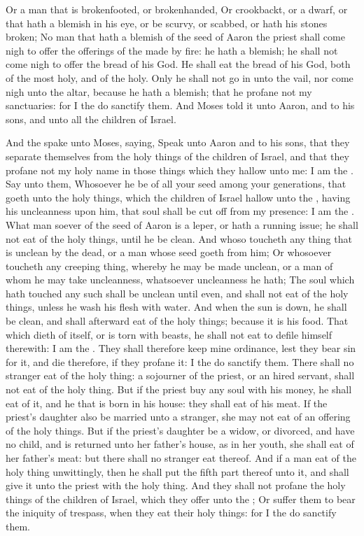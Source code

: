\begin{biblechapter}
\verse Or a man that is brokenfooted, or brokenhanded,
\verse Or crookbackt, or a dwarf, or that hath a blemish in his eye, or be scurvy, or scabbed, or hath his stones broken;
\verse No man that hath a blemish of the seed of Aaron the priest shall come nigh to offer the offerings of the \LORD made by fire: he hath a blemish; he shall not come nigh to offer the bread of his God.
\verse He shall eat the bread of his God, both of the most holy, and of the holy.
\verse Only he shall not go in unto the vail, nor come nigh unto the altar, because he hath a blemish; that he profane not my sanctuaries: for I the \LORD do sanctify them.
\verse And Moses told it unto Aaron, and to his sons, and unto all the children of Israel.
\end{biblechapter}

\begin{biblechapter} %
\verse And the \LORD spake unto Moses, saying,
\verse Speak unto Aaron and to his sons, that they separate themselves from the holy things of the children of Israel, and that they profane not my holy name in those things which they hallow unto me: I am the \LORD.
\verse Say unto them, Whosoever he be of all your seed among your generations, that goeth unto the holy things, which the children of Israel hallow unto the \LORD, having his uncleanness upon him, that soul shall be cut off from my presence: I am the \LORD.
\verse What man soever of the seed of Aaron is a leper, or hath a running issue; he shall not eat of the holy things, until he be clean. And whoso toucheth any thing that is unclean by the dead, or a man whose seed goeth from him;
\verse Or whosoever toucheth any creeping thing, whereby he may be made unclean, or a man of whom he may take uncleanness, whatsoever uncleanness he hath;
\verse The soul which hath touched any such shall be unclean until even, and shall not eat of the holy things, unless he wash his flesh with water.
\verse And when the sun is down, he shall be clean, and shall afterward eat of the holy things; because it is his food.
\verse That which dieth of itself, or is torn with beasts, he shall not eat to defile himself therewith: I am the \LORD.
\verse They shall therefore keep mine ordinance, lest they bear sin for it, and die therefore, if they profane it: I the \LORD do sanctify them.
\verse There shall no stranger eat of the holy thing: a sojourner of the priest, or an hired servant, shall not eat of the holy thing.
\verse But if the priest buy any soul with his money, he shall eat of it, and he that is born in his house: they shall eat of his meat.
\verse If the priest's daughter also be married unto a stranger, she may not eat of an offering of the holy things.
\verse But if the priest's daughter be a widow, or divorced, and have no child, and is returned unto her father's house, as in her youth, she shall eat of her father's meat: but there shall no stranger eat thereof.
\verse And if a man eat of the holy thing unwittingly, then he shall put the fifth part thereof unto it, and shall give it unto the priest with the holy thing.
\verse And they shall not profane the holy things of the children of Israel, which they offer unto the \LORD;
\verse Or suffer them to bear the iniquity of trespass, when they eat their holy things: for I the \LORD do sanctify them.

\end{biblechapter}
